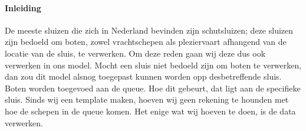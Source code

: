  


\paragraph{Inleiding}




De meeste sluizen die zich in Nederland bevinden zijn schutsluizen; deze sluizen zijn bedoeld om boten, zowel vrachtschepen als pleziervaart afhangend van de locatie van de sluis, te verwerken. Om deze reden gaan wij deze dus ook verwerken in ons model. Mocht een sluis niet bedoeld zijn om boten te verwerken, dan zou dit model alsnog toegepast kunnen worden opp desbetreffende sluis.
Boten worden toegevoed aan de queue. Hoe dit gebeurt, dat ligt aan de specifieke sluis.  Sinds wij een template maken, hoeven wij geen rekening te hounden met hoe de schepen in de queue komen. Het enige wat wij hoeven te doen, is de data verwerken.




